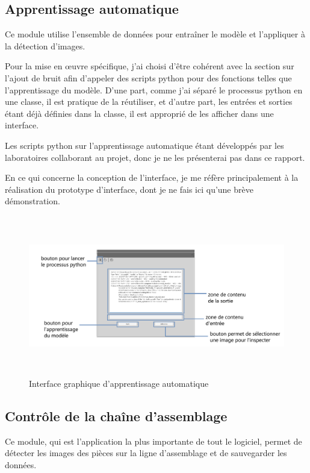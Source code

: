 \newpage
\subsection{Apprentissage automatique}
Ce module utilise l'ensemble de données pour entraîner le modèle et l'appliquer à la détection d'images. 

Pour la mise en œuvre spécifique, j'ai choisi d'être cohérent avec la section sur l'ajout de bruit afin d'appeler des scripts python pour des fonctions telles que l'apprentissage du modèle. D'une part, comme j'ai séparé le processus python en une classe, il est pratique de la réutiliser, et d'autre part, les entrées et sorties étant déjà définies dans la classe, il est approprié de les afficher dans une interface.

Les scripts python sur l'apprentissage automatique étant développés par les laboratoires collaborant au projet, donc je ne les présenterai pas dans ce rapport. 

En ce qui concerne la conception de l'interface, je me réfère principalement à la réalisation du prototype d'interface, dont je ne fais ici qu'une brève démonstration.

\begin{figure}[H]
    \centering
    \includegraphics[height=7cm]{ressources/images/machine_learning.png}
    \caption{Interface graphique d'apprentissage automatique}
\end{figure}

\newpage
\subsection{Contrôle de la chaîne d'assemblage} 
Ce module, qui est l'application la plus importante de tout le logiciel, permet de détecter les images des pièces sur la ligne d'assemblage et de sauvegarder les données.


